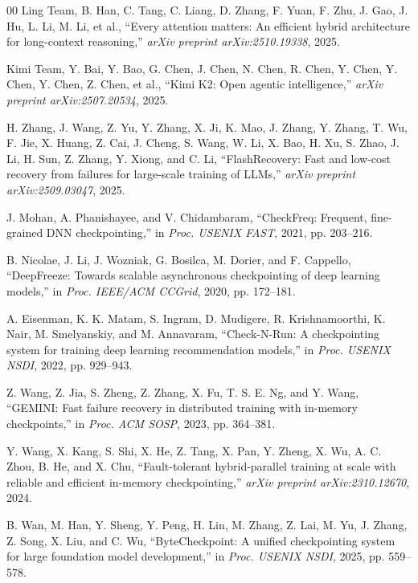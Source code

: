 \documentclass[10pt,conference]{IEEEtran}
\begin{document}
\begin{thebibliography}{00}
 Ling Team, B. Han, C. Tang, C. Liang, D. Zhang, F. Yuan, F. Zhu, J. Gao, J. Hu, L. Li, M. Li, et al., ``Every attention matters: An efficient hybrid architecture for long-context reasoning,'' \textit{arXiv preprint arXiv:2510.19338}, 2025.

 Kimi Team, Y. Bai, Y. Bao, G. Chen, J. Chen, N. Chen, R. Chen, Y. Chen, Y. Chen, Y. Chen, Z. Chen, et al., ``Kimi K2: Open agentic intelligence,'' \textit{arXiv preprint arXiv:2507.20534}, 2025.

 H. Zhang, J. Wang, Z. Yu, Y. Zhang, X. Ji, K. Mao, J. Zhang, Y. Zhang, T. Wu, F. Jie, X. Huang, Z. Cai, J. Cheng, S. Wang, W. Li, X. Bao, H. Xu, S. Zhao, J. Li, H. Sun, Z. Zhang, Y. Xiong, and C. Li, ``FlashRecovery: Fast and low-cost recovery from failures for large-scale training of LLMs,'' \textit{arXiv preprint arXiv:2509.03047}, 2025.

 J. Mohan, A. Phanishayee, and V. Chidambaram, ``CheckFreq: Frequent, fine-grained DNN checkpointing,'' in \textit{Proc. USENIX FAST}, 2021, pp. 203--216.

 B. Nicolae, J. Li, J. Wozniak, G. Bosilca, M. Dorier, and F. Cappello, ``DeepFreeze: Towards scalable asynchronous checkpointing of deep learning models,'' in \textit{Proc. IEEE/ACM CCGrid}, 2020, pp. 172--181.

 A. Eisenman, K. K. Matam, S. Ingram, D. Mudigere, R. Krishnamoorthi, K. Nair, M. Smelyanskiy, and M. Annavaram, ``Check-N-Run: A checkpointing system for training deep learning recommendation models,'' in \textit{Proc. USENIX NSDI}, 2022, pp. 929--943.

 Z. Wang, Z. Jia, S. Zheng, Z. Zhang, X. Fu, T. S. E. Ng, and Y. Wang, ``GEMINI: Fast failure recovery in distributed training with in-memory checkpoints,'' in \textit{Proc. ACM SOSP}, 2023, pp. 364--381.

 Y. Wang, X. Kang, S. Shi, X. He, Z. Tang, X. Pan, Y. Zheng, X. Wu, A. C. Zhou, B. He, and X. Chu, ``Fault-tolerant hybrid-parallel training at scale with reliable and efficient in-memory checkpointing,'' \textit{arXiv preprint arXiv:2310.12670}, 2024.

 B. Wan, M. Han, Y. Sheng, Y. Peng, H. Lin, M. Zhang, Z. Lai, M. Yu, J. Zhang, Z. Song, X. Liu, and C. Wu, ``ByteCheckpoint: A unified checkpointing system for large foundation model development,'' in \textit{Proc. USENIX NSDI}, 2025, pp. 559--578.


\end{thebibliography}
\end{document}
